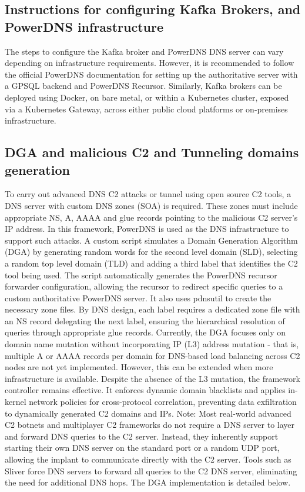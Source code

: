 \documentclass [11pt, proquest] {uwthesis}[2020/02/24]
\begin{document}
\subsection{Instructions for configuring Kafka Brokers, and PowerDNS infrastructure}
The steps to configure the Kafka broker and PowerDNS DNS server can vary depending on infrastructure requirements. However, it is recommended to follow the official PowerDNS documentation for setting up the authoritative server with a GPSQL backend and PowerDNS Recursor. Similarly, Kafka brokers can be deployed using Docker, on bare metal, or within a Kubernetes cluster, exposed via a Kubernetes Gateway, across either public cloud platforms or on-premises infrastructure.

\subsection{DGA and malicious C2 and Tunneling domains generation}
To carry out advanced DNS C2 attacks or tunnel using open source C2 tools, a DNS server with custom DNS zones (SOA) is required. These zones must include appropriate NS, A, AAAA and glue records pointing to the malicious C2 server’s IP address. In this framework, PowerDNS is used as the DNS infrastructure to support such attacks. A custom script simulates a Domain Generation Algorithm (DGA) by generating random words for the second level domain (SLD), selecting a random top level domain (TLD) and adding a third label that identifies the C2 tool being used. The script automatically generates the PowerDNS recursor forwarder configuration, allowing the recursor to redirect specific queries to a custom authoritative PowerDNS server. It also uses pdnsutil to create the necessary zone files. By DNS design, each label requires a dedicated zone file with an NS record delegating the next label, ensuring the hierarchical resolution of queries through appropriate glue records. Currently, the DGA focuses only on domain name mutation without incorporating IP (L3) address mutation - that is, multiple A or AAAA records per domain for DNS-based load balancing across C2 nodes are not yet implemented. However, this can be extended when more infrastructure is available. Despite the absence of the L3 mutation, the framework controller remains effective. It enforces dynamic domain blacklists and applies in-kernel network policies for cross-protocol correlation, preventing data exfiltration to dynamically generated C2 domains and IPs. Note: Most real-world advanced C2 botnets and multiplayer C2 frameworks do not require a DNS server to layer and forward DNS queries to the C2 server. Instead, they inherently support starting their own DNS server on the standard port or a random UDP port, allowing the implant to communicate directly with the C2 server. Tools such as Sliver force DNS servers to forward all queries to the C2 DNS server, eliminating the need for additional DNS hops.
The DGA implementation is detailed below.
\end{document}
